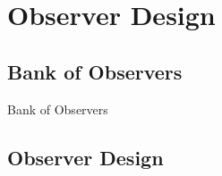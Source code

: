 
\section{Observer Design}%
\label{sec:observer-design}

\subsection{Bank of Observers}%
\label{subsec:bank-of-observers}

\begin{slide}{Bank of Observers}
  
\end{slide}

\subsection{Observer Design}%
\label{subsec:observer-design}

